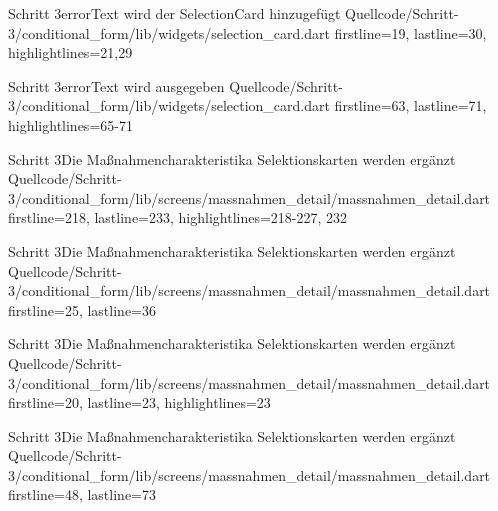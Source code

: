 \begin{alexlistingzwei}{Schritt 3}{errorText wird der SelectionCard hinzugefügt}
    {Quellcode/Schritt-3/conditional_form/lib/widgets/selection_card.dart}
    {firstline=19, lastline=30, highlightlines={21,29}}
    \label{lst:Schritt3DieMassnahmencharakteristikaSelektionskartenWerdenergaenzt}
\end{alexlistingzwei}

\begin{alexlistingzwei}{Schritt 3}{errorText wird ausgegeben}
    {Quellcode/Schritt-3/conditional_form/lib/widgets/selection_card.dart}
    {firstline=63, lastline=71, highlightlines={65-71}}
    \label{lst:Schritt3DieMassnahmencharakteristikaSelektionskartenWerdenergaenzt}
\end{alexlistingzwei}

\begin{alexlistingzwei}{Schritt 3}{Die Maßnahmencharakteristika Selektionskarten werden ergänzt}
    {Quellcode/Schritt-3/conditional_form/lib/screens/massnahmen_detail/massnahmen_detail.dart}
    {firstline=218, lastline=233, highlightlines={218-227, 232}}
    \label{lst:Schritt3DieMassnahmencharakteristikaSelektionskartenWerdenergaenzt}
\end{alexlistingzwei}

\begin{alexlistingzwei}{Schritt 3}{Die Maßnahmencharakteristika Selektionskarten werden ergänzt}
    {Quellcode/Schritt-3/conditional_form/lib/screens/massnahmen_detail/massnahmen_detail.dart}
    {firstline=25, lastline=36}
    \label{lst:Schritt3DieMassnahmencharakteristikaSelektionskartenWerdenergaenzt}
\end{alexlistingzwei}

\begin{alexlistingzwei}{Schritt 3}{Die Maßnahmencharakteristika Selektionskarten werden ergänzt}
    {Quellcode/Schritt-3/conditional_form/lib/screens/massnahmen_detail/massnahmen_detail.dart}
    {firstline=20, lastline=23, highlightlines={23}}
    \label{lst:Schritt3DieMassnahmencharakteristikaSelektionskartenWerdenergaenzt}
\end{alexlistingzwei}


\begin{alexlistingzwei}{Schritt 3}{Die Maßnahmencharakteristika Selektionskarten werden ergänzt}
    {Quellcode/Schritt-3/conditional_form/lib/screens/massnahmen_detail/massnahmen_detail.dart}
    {firstline=48, lastline=73}
    \label{lst:Schritt3DieMassnahmencharakteristikaSelektionskartenWerdenergaenzt}
\end{alexlistingzwei}



